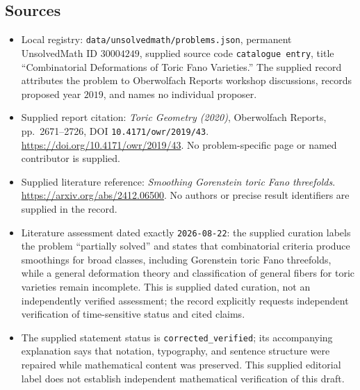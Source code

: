 \documentclass[11pt]{article}
\begin{document}
\subsection{Sources}
\begin{itemize}
\item Local registry: \texttt{data/unsolvedmath/problems.json}, permanent UnsolvedMath ID \(30004249\), supplied source code \texttt{catalogue entry}, title ``Combinatorial Deformations of Toric Fano Varieties.'' The supplied record attributes the problem to Oberwolfach Reports workshop discussions, records proposed year \(2019\), and names no individual proposer.
\item Supplied report citation: \emph{Toric Geometry (2020)}, Oberwolfach Reports, pp.~2671--2726, DOI \texttt{10.4171/owr/2019/43}. \url{https://doi.org/10.4171/owr/2019/43}. No problem-specific page or named contributor is supplied.
\item Supplied literature reference: \emph{Smoothing Gorenstein toric Fano threefolds}. \url{https://arxiv.org/abs/2412.06500}. No authors or precise result identifiers are supplied in the record.
\item Literature assessment dated exactly \texttt{2026-08-22}: the supplied curation labels the problem ``partially solved'' and states that combinatorial criteria produce smoothings for broad classes, including Gorenstein toric Fano threefolds, while a general deformation theory and classification of general fibers for toric varieties remain incomplete. This is supplied dated curation, not an independently verified assessment; the record explicitly requests independent verification of time-sensitive status and cited claims.
\item The supplied statement status is \texttt{corrected\_verified}; its accompanying explanation says that notation, typography, and sentence structure were repaired while mathematical content was preserved. This supplied editorial label does not establish independent mathematical verification of this draft.
\end{itemize}
\end{document}
